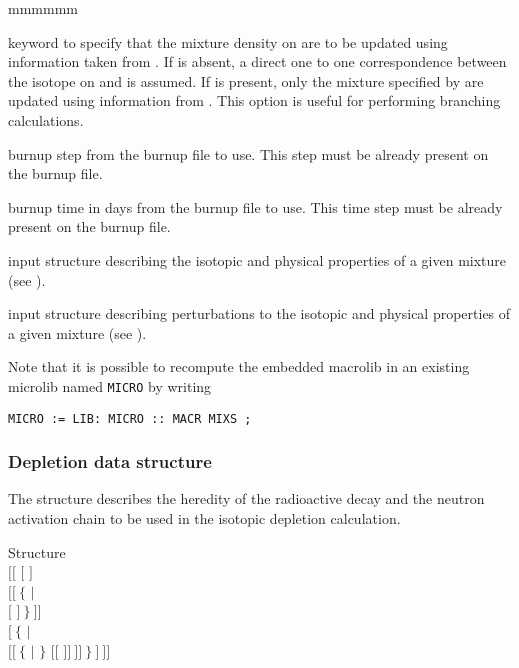 \begin{ListeDeDescription}{mmmmmm}
\item[\moc{BURN}] keyword to specify that the mixture density on 
are to be updated using information taken from . If 
is absent, a direct one to one correspondence between the isotope on
 and   is assumed. If   is present, only
the mixture specified by  are updated using information from
. This option is useful for performing branching calculations.

\item[\dusa{iburn}] burnup step from the burnup file to use. This step must be
already present on the burnup file.

\item[\dusa{tburn}] burnup time in days from the burnup file to use. This time
step must be already present on the burnup file.

\item[\dstr{descmix1}] input structure describing the
isotopic and physical properties of a given mixture (see ).

\item[\dstr{descmix2}] input structure describing perturbations to the
isotopic and physical properties of a given mixture (see ).


\end{ListeDeDescription}

Note that it is possible to recompute the embedded macrolib in an existing microlib
named {\tt MICRO} by writing
\begin{verbatim}
MICRO := LIB: MICRO :: MACR MIXS ;
\end{verbatim}

\subsubsection{Depletion data structure}\label{sect:descdepl}

The structure  describes the heredity of the radioactive decay
and the neutron activation chain to be used in the isotopic depletion
calculation.
\begin{DataStructure}{Structure }
 \\
$[[$  $[$  $]$ \\
\hskip 1.0cm $[[~\{$   $|$ \\
\hskip 2.0cm  $[$  $]~\}~]]$ \\
\hskip 1.0cm $[~\{$  $|$ \\
\hskip 2.0cm  $[[~\{$  $|$  $\}$
$[[$   $]]~]]~\}~]~]]$\\
\end{DataStructure}

